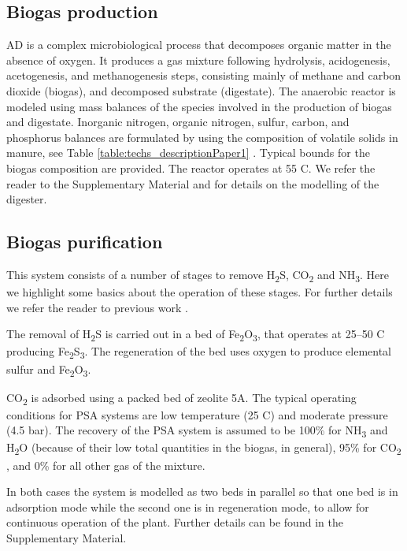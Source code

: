 \begin{refsection}[referencesCh2]
\subsection{Biogas production} \label{section:BiogasProduction}
AD is a complex microbiological process that decomposes organic matter in the absence of oxygen. It produces a gas mixture following hydrolysis, acidogenesis, acetogenesis, and methanogenesis steps, consisting mainly of methane and carbon dioxide (biogas), and decomposed substrate (digestate). The anaerobic reactor is modeled using mass balances of the species involved in the production of biogas and digestate. Inorganic nitrogen, organic nitrogen, sulfur, carbon, and phosphorus balances are formulated by using the composition of volatile solids in manure, see Table \ref{table:techs_descriptionPaper1} \citep{kowalski2013changes, Lorimor2004, AlSeadi2008, martins2009biogas}. Typical bounds for the biogas composition are provided. The reactor operates at 55 \textdegree C. We refer the reader to the Supplementary Material and \citet{Leon} for details on the modelling of the digester.

\subsection{Biogas purification} \label{section:BiogasPurification}
This system consists of a number of stages to remove H\textsubscript{2}S, CO\textsubscript{2} and NH\textsubscript{3}. Here we highlight some basics about the operation of these stages. For further details we refer the reader to previous work \citep{Leon}.

The removal of H\textsubscript{2}S is carried out in a bed of Fe\textsubscript{2}O\textsubscript{3}, that operates at 25–50 \textdegree C producing Fe\textsubscript{2}S\textsubscript{3}. The regeneration of the bed
uses oxygen to produce elemental sulfur and Fe\textsubscript{2}O\textsubscript{3}.

CO\textsubscript{2} is adsorbed using a packed bed of zeolite 5A. The typical operating conditions for PSA systems are low temperature (25 \textdegree C) and moderate pressure (4.5 bar). The recovery of the PSA system is assumed to be 100\% for NH\textsubscript{3} and H\textsubscript{2}O (because of their low total quantities in the biogas, in general), 95\% for CO\textsubscript{2} , and 0\% for all other gas of the mixture.

In both cases the system is modelled as two beds in parallel so that one bed is in adsorption mode while the second one is in regeneration mode, to allow for continuous operation of the plant. Further details can be found in the Supplementary Material.


\end{refsection}
